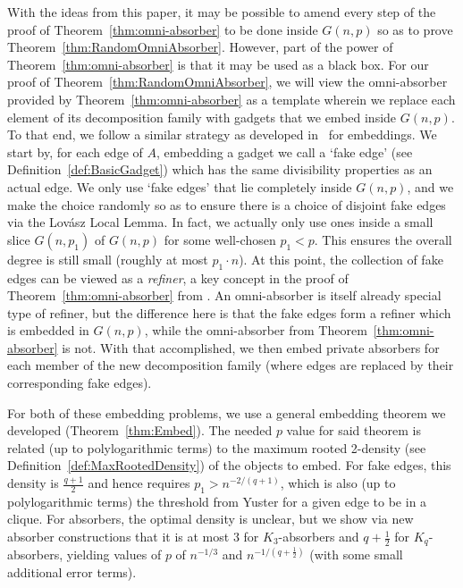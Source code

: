 \documentclass[11pt]{article}
\numberwithin{equation}{section}
\newcounter{i}
\theoremstyle{plain}
\theoremstyle{plain} %
\theoremstyle{definition}
\begin{document}
With the ideas from this paper, it may be possible to amend every step of the proof of Theorem~\ref{thm:omni-absorber} to be done inside $G(n,p)$ so as to prove Theorem~\ref{thm:RandomOmniAbsorber}.
However, part of the power of Theorem~\ref{thm:omni-absorber} is that it may be used as a black box.
For our proof of Theorem~\ref{thm:RandomOmniAbsorber}, we will view the omni-absorber provided by Theorem~\ref{thm:omni-absorber} as a template wherein we replace each element of its decomposition family with gadgets that we embed inside $G(n,p)$. To that end, we follow a similar strategy as developed in~\cite{DPI} for embeddings. We start by, for each edge of $A$, embedding a gadget we call a `fake edge' (see Definition~\ref{def:BasicGadget}) which has the same divisibility properties as an actual edge. We only use `fake edges' that lie completely inside $G(n,p)$, and we make the choice randomly so as to ensure there is a choice of disjoint fake edges via the Lov\'asz Local Lemma. 
In fact, we actually only use ones inside a small slice $G(n,p_1)$ of $G(n,p)$ for some well-chosen $p_1 < p$.  
This ensures the overall degree is still small (roughly at most $p_1 \cdot n$).  
At this point, the collection of fake edges can be viewed as a \textit{refiner}, a key concept in the proof of Theorem~\ref{thm:omni-absorber} from \cite{DPI}.  An omni-absorber is itself already special type of refiner, but the difference here is that the fake edges form a refiner which is embedded in $G(n,p)$, while the omni-absorber from Theorem~\ref{thm:omni-absorber} is not.
With that accomplished, we then embed private absorbers for each member of the new decomposition family (where edges are replaced by their corresponding fake edges). 

For both of these embedding problems, we use a general embedding theorem we developed (Theorem~\ref{thm:Embed}). The needed $p$ value for said theorem is related (up to polylogarithmic terms) to the maximum rooted 2-density (see Definition~\ref{def:MaxRootedDensity}) of the objects to embed. For fake edges, this density is $\frac{q+1}{2}$ and hence requires $p_1 > n^{-2/(q+1)}$, which is also (up to polylogarithmic terms) the threshold from Yuster for a given edge to be in a clique. For absorbers, the optimal density is unclear, but we show via new absorber constructions that it is at most $3$ for $K_3$-absorbers and $q+\frac{1}{2}$ for $K_q$-absorbers, yielding values of $p$ of $n^{-1/3}$ and $n^{-1/\left(q+\frac{1}{2}\right)}$ (with some small additional error terms). 
\end{document}
